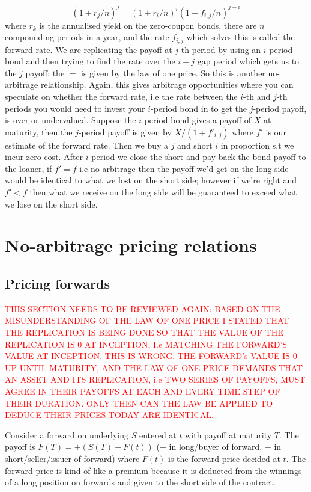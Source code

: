 \documentclass[9pt]{extarticle}
\begin{document}
$$(1+r_j/n)^j = (1+r_i/n)^i(1+f_{i,j}/n)^{j-i} $$
where $r_k$ is the annualised yield on the zero-coupon bonds, there are $n$ compounding periods in a year, 
and the rate $f_{i,j}$ which solves this is called the forward rate. We are replicating 
the payoff at $j$-th period by using an $i$-period bond and then trying to find the rate over the $i-j$ gap period 
which gets us to the $j$ payoff; the $=$ is given by the law of one price. So this is another no-arbitrage relationship. Again, this gives arbitrage opportunities
where you can speculate on whether the forward rate, i.e the rate between the $i$-th and $j$-th periods you would 
need to invest your $i$-period bond in to get the $j$-period payoff, is over or undervalued. Suppose the $i$-period bond 
gives a payoff of $X$ at maturity, then the $j$-period payoff is given by $X/(1+f'_{i,j})$ where $f'$ is our 
estimate of the forward rate. Then we buy a $j$ and short $i$ in proportion s.t we 
incur zero cost. After $i$ period we close the short and pay back the bond payoff to the loaner, 
if $f'=f$ i.e no-arbitrage then the payoff we'd get on the long side would be identical to what 
we lost on the short side; however if we're right and $f'<f$ then what we receive on the long side 
will be guaranteed to exceed what we lose on the short side.

\newpage
\section{No-arbitrage pricing relations}

\subsection{Pricing forwards}
\textcolor{red}{THIS SECTION NEEDS TO BE REVIEWED AGAIN: BASED ON THE MISUNDERSTANDING OF THE LAW OF ONE PRICE 
I STATED THAT THE REPLICATION IS BEING DONE SO THAT THE VALUE OF THE REPLICATION IS 0 AT INCEPTION, I.e MATCHING 
THE FORWARD'S VALUE AT INCEPTION. THIS IS WRONG. THE FORWARD's VALUE IS 0 UP UNTIL MATURITY, AND THE 
LAW OF ONE PRICE DEMANDS THAT AN ASSET AND ITS REPLICATION, i.e TWO SERIES OF PAYOFFS, 
MUST AGREE IN THEIR PAYOFFS AT EACH AND EVERY TIME STEP OF THEIR DURATION. ONLY THEN CAN THE LAW BE APPLIED TO DEDUCE THEIR PRICES TODAY 
ARE IDENTICAL.}


Consider a forward on underlying $S$ entered at $t$ with payoff 
at maturity $T$. The payoff is $F(T)=\pm (S(T)-F(t))$ ($+$ in long/buyer of 
forward, $-$ in short/seller/issuer of forward) where $F(t)$ is 
the forward price decided at $t$. The forward price is kind of like a premium 
because it is deducted from the winnings of a long position on forwards 
and given to the short side of the contract.
\end{document}
